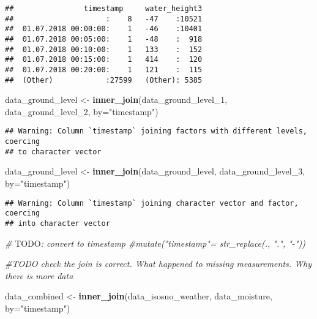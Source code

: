 \documentclass[]{article}
\newenvironment{Shaded}{\begin{snugshade}}{\end{snugshade}}
\newcommand{\KeywordTok}[1]{\textcolor[rgb]{0.13,0.29,0.53}{\textbf{#1}}}
\newcommand{\DataTypeTok}[1]{\textcolor[rgb]{0.13,0.29,0.53}{#1}}
\newcommand{\DecValTok}[1]{\textcolor[rgb]{0.00,0.00,0.81}{#1}}
\newcommand{\StringTok}[1]{\textcolor[rgb]{0.31,0.60,0.02}{#1}}
\newcommand{\CommentTok}[1]{\textcolor[rgb]{0.56,0.35,0.01}{\textit{#1}}}
\newcommand{\AlertTok}[1]{\textcolor[rgb]{0.94,0.16,0.16}{#1}}
\newcommand{\NormalTok}[1]{#1}
\begin{document}
\begin{verbatim}
##                timestamp     water_height3  
##                     :    8   -47    :10521  
##  01.07.2018 00:00:00:    1   -46    :10401  
##  01.07.2018 00:05:00:    1   -48    :  918  
##  01.07.2018 00:10:00:    1   133    :  152  
##  01.07.2018 00:15:00:    1   414    :  120  
##  01.07.2018 00:20:00:    1   121    :  115  
##  (Other)            :27599   (Other): 5385
\end{verbatim}

\begin{Shaded}
\begin{Highlighting}[]
\NormalTok{data_ground_level <-}\StringTok{ }\KeywordTok{inner_join}\NormalTok{(data_ground_level_}\DecValTok{1}\NormalTok{, data_ground_level_}\DecValTok{2}\NormalTok{, }\DataTypeTok{by=}\StringTok{"timestamp"}\NormalTok{)}
\end{Highlighting}
\end{Shaded}

\begin{verbatim}
## Warning: Column `timestamp` joining factors with different levels, coercing
## to character vector
\end{verbatim}

\begin{Shaded}
\begin{Highlighting}[]
\NormalTok{data_ground_level <-}\StringTok{ }\KeywordTok{inner_join}\NormalTok{(data_ground_level, data_ground_level_}\DecValTok{3}\NormalTok{, }\DataTypeTok{by=}\StringTok{"timestamp"}\NormalTok{)}
\end{Highlighting}
\end{Shaded}

\begin{verbatim}
## Warning: Column `timestamp` joining character vector and factor, coercing
## into character vector
\end{verbatim}

\begin{Shaded}
\begin{Highlighting}[]
  \CommentTok{# }\AlertTok{TODO}\CommentTok{: convert to timestamp}
  \CommentTok{#mutate("timestamp"= str_replace(., ".", "-"))}

\CommentTok{#TODO check the join is correct. What happened to missing measurements. Why there is more data}
\end{Highlighting}
\end{Shaded}

\begin{Shaded}
\begin{Highlighting}[]
\NormalTok{data_combined <-}\StringTok{ }\KeywordTok{inner_join}\NormalTok{(data_isosuo_weather, data_moisture, }\DataTypeTok{by=}\StringTok{"timestamp"}\NormalTok{)}
\end{Highlighting}
\end{Shaded}
\end{document}
